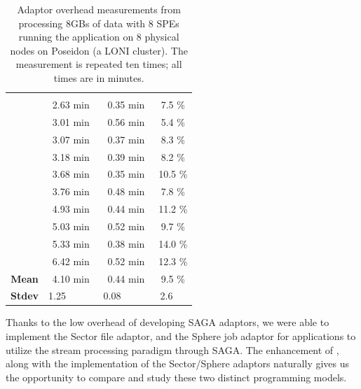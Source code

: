 \documentclass[3p,twocolumn]{elsarticle}
\begin{document}
\begin{table}[h!]
  \footnotesize
  \begin{tabular}{cccc}
    \hline         & \B{total}  & \B{abs. overhead} & \B{rel. overhead} \\
                   & 2.63 min   & 0.35 min            &   7.5  \%         \\
                   & 3.01 min   & 0.56 min            &   5.4  \%         \\
                   & 3.07 min   & 0.37 min            &   8.3  \%         \\
                   & 3.18 min   & 0.39 min            &   8.2  \%         \\
                   & 3.68 min   & 0.35 min            &  10.5  \%         \\
                   & 3.76 min   & 0.48 min            &   7.8  \%         \\
                   & 4.93 min   & 0.44 min            &  11.2  \%         \\
                   & 5.03 min   & 0.52 min            &   9.7  \%         \\
                   & 5.33 min   & 0.38 min            &  14.0  \%         \\
                   & 6.42 min   & 0.52 min            &  12.3  \%         \\
    \hline
    { {\bf Mean}}  & 4.10 min   & 0.44 min            &   9.5  \%         \\
    \hline
    { {\bf Stdev}} & 1.25 ~~~~~ & 0.08 ~~~~~          &   2.6 ~~          \\
    \hline \hline
  \end{tabular}
  \caption{Adaptor overhead measurements from processing 8GBs of data with 8
  SPEs running the \wc application on 8 physical nodes on Poseidon (a
  LONI cluster). The measurement is repeated ten times; all times are in minutes.
  \label{tab:sphere_overhead}}
\end{table}


Thanks to the low overhead of developing SAGA adaptors, we were able
to implement the Sector file adaptor, and the Sphere job adaptor for
applications to utilize the stream processing paradigm through SAGA.
The enhancement of \sagamapreduce, along with the implementation of the
Sector/Sphere adaptors naturally gives us the opportunity to compare
and study these two distinct programming models.
\end{document}
